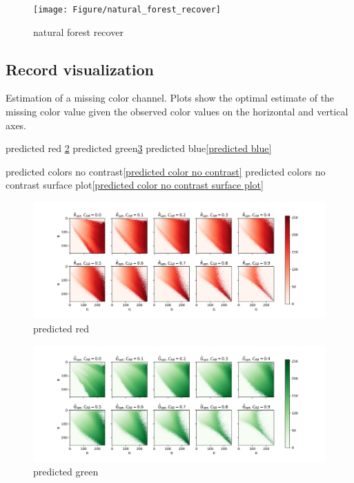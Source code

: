 \documentclass[11pt]{scrartcl} %
\begin{document}
\begin{figure}[h] %
	\centering
	\texttt{[image: Figure/natural\_forest\_recover]} %
	\caption{natural forest recover}
	\label{natural_forest_recover}
\end{figure}

\subsection{Record visualization}

Estimation of a missing color channel. Plots show the optimal estimate of the missing color value given the observed color values on the horizontal and vertical axes.

predicted red \ref{predicted red} 
predicted green\ref{predicted green}
predicted blue\ref{predicted blue}

predicted colors no contrast\ref{predicted color no contrast}
predicted colors no contrast surface plot\ref{predicted color no contrast surface plot}

\begin{figure}[h] %
	\centering
	\includegraphics[width=1\columnwidth]{Figure/predicted_red} %
	\caption{predicted red}
	\label{predicted red}
\end{figure}

\begin{figure}[h] %
	\centering
	\includegraphics[width=1\columnwidth]{Figure/predicted_green} %
	\caption{predicted green}
	\label{predicted green}
\end{figure}
\end{document}
